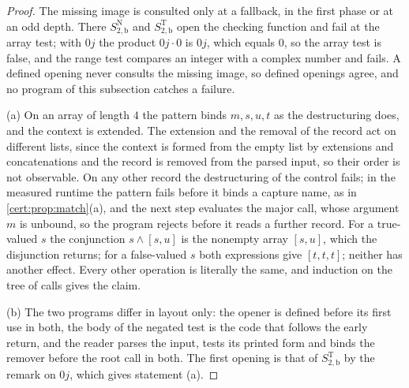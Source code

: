 \begin{proof}
The missing image is consulted only at a fallback, in the first phase or at an odd
depth. There $S^{\mathrm N}_{2,\mathrm b}$ and $S^{\mathrm T}_{2,\mathrm b}$ open the
checking function and fail at the array test; with $0j$ the product $0j\cdot 0$ is
$0j$, which equals $0$, so the array test is false, and the range test compares an
integer with a complex number and fails. A defined opening never consults the missing
image, so defined openings agree, and no program of this subsection catches a failure.

(a) On an array of length $4$ the pattern binds $m,s,u,t$ as the destructuring does,
and the context is extended. The extension and the removal of the record act on
different lists, since the context is formed from the empty list by extensions and
concatenations and the record is removed from the parsed input, so their order is
not observable. On any other record the destructuring of the control fails; in the
measured runtime the pattern fails before it binds a capture name, as in
\cref{cert:prop:match}(a), and the next step evaluates the major call, whose
argument $m$ is unbound, so the program rejects before it reads a further record.
For a true-valued $s$ the conjunction $s\land[s,u]$ is the nonempty array $[s,u]$,
which the disjunction returns; for a false-valued $s$ both expressions give
$[t,t,t]$; neither has another effect. Every other operation is literally the same,
and induction on the tree of calls gives the claim.

(b) The two programs differ in layout only: the opener is defined before its first
use in both, the body of the negated test is the code that follows the early return,
and the reader parses the input, tests its printed form and binds the remover before
the root call in both. The first opening is that of $S^{\mathrm T}_{2,\mathrm b}$ by
the remark on $0j$, which gives statement (a).


\end{proof}
